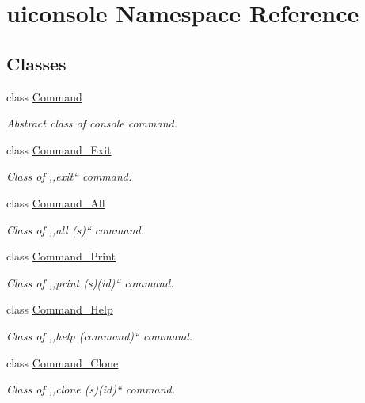 \hypertarget{namespaceuiconsole}{
\section{uiconsole Namespace Reference}
\label{da/de1/namespaceuiconsole}
}
\subsection*{Classes}
\begin{DoxyCompactItemize}
\item 
class \hyperlink{classuiconsole_1_1Command}{Command}
\begin{DoxyCompactList}\small\item\em Abstract class of console command. \item\end{DoxyCompactList}\item 
class \hyperlink{classuiconsole_1_1Command__Exit}{Command\_\-Exit}
\begin{DoxyCompactList}\small\item\em Class of ,,exit`` command. \item\end{DoxyCompactList}\item 
class \hyperlink{classuiconsole_1_1Command__All}{Command\_\-All}
\begin{DoxyCompactList}\small\item\em Class of ,,all (s)`` command. \item\end{DoxyCompactList}\item 
class \hyperlink{classuiconsole_1_1Command__Print}{Command\_\-Print}
\begin{DoxyCompactList}\small\item\em Class of ,,print (s)(id)`` command. \item\end{DoxyCompactList}\item 
class \hyperlink{classuiconsole_1_1Command__Help}{Command\_\-Help}
\begin{DoxyCompactList}\small\item\em Class of ,,help (command)`` command. \item\end{DoxyCompactList}\item 
class \hyperlink{classuiconsole_1_1Command__Clone}{Command\_\-Clone}
\begin{DoxyCompactList}\small\item\em Class of ,,clone (s)(id)`` command. \item\end{DoxyCompactList}\item 

\end{DoxyCompactItemize}
